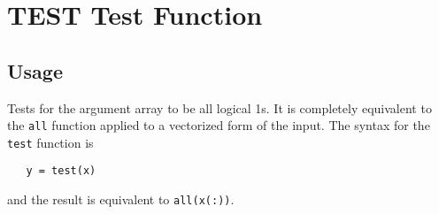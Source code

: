 \section{TEST Test Function}

\subsection{Usage}

Tests for the argument array to be all logical 1s.  It is 
completely equivalent to the \verb|all| function applied to
a vectorized form of the input.  The syntax for the \verb|test|
function is
\begin{verbatim}
   y = test(x)
\end{verbatim}
and the result is equivalent to \verb|all(x(:))|.

